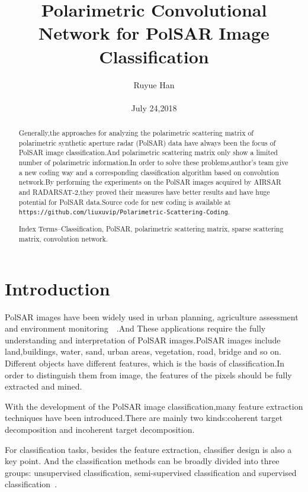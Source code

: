 \documentclass[10pt,twocolumn,letterpaper]{article}
\begin{document}
\title{Polarimetric Convolutional Network for PolSAR
Image Classification}

\author{Ruyue Han\\\\July 24,2018}

\maketitle

\begin{abstract}
   Generally,the approaches for analyzing the polarimetric scattering matrix of polarimetric synthetic aperture radar (PolSAR) data have always been the focus of PolSAR image classification.And polarimetric scattering matrix only show a limited number of polarimetric information.In order to solve these problems,author's team give a new coding way and a corresponding classification algorithm based on convolution network.By performing the experiments on the PolSAR images acquired by AIRSAR and RADARSAT-2,they proved their measures have better results and have huge potential for PolSAR data.Source code for new coding is available at \nolinkurl{https://github.com/liuxuvip/Polarimetric-Scattering-Coding}.
   
   
   Index Terms--Classification, PolSAR, polarimetric scattering matrix, sparse scattering matrix, convolution network.

\end{abstract}
\section{Introduction}
	PolSAR images have been widely used in urban planning, agriculture assessment and environment monitoring~\cite{Comparison2017_1}~\cite{Observations2016_2}.And These applications require the fully understanding and interpretation of PolSAR images.PolSAR images include land,buildings, water, sand, urban areas, vegetation, road, bridge and so on. Different objects have different features, which is the basis of classification.In order to distinguish them from image, the features of the pixels should be fully extracted and mined.
	
	
	With the development of the PolSAR image classification,many feature extraction techniques have been introduced.There are mainly two kinds:coherent target decomposition and incoherent target decomposition.
	
	
	For classification tasks, besides the feature extraction, classifier design is also a key point. And the classification methods can be broadly divided into three groups: unsupervised classification, semi-supervised classification and supervised classification~\cite{Semisupervised2016_3}.
	
\end{document}
